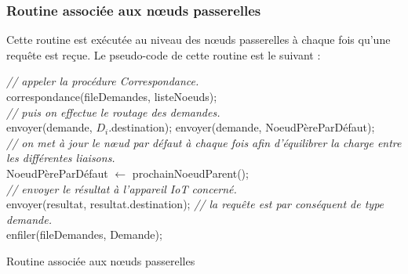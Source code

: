\subsubsection{Routine associée aux nœuds passerelles}
Cette routine est exécutée au niveau des nœuds passerelles à chaque fois qu'une requête est reçue.
Le pseudo-code de cette routine est le suivant :\\
\begin{algorithm}[H]
  {  
    \emph{// appeler la  procédure Correspondance.}\\
    correspondance(fileDemandes, listeNoeuds);\\
    \emph{// puis on effectue le routage des demandes.}\\
    {
      {
        envoyer(demande, $D_i$.destination);
      }
      {
        envoyer(demande, NoeudPèreParDéfaut);\\
        \emph{// on met à jour le nœud par défaut à chaque fois afin d'équilibrer la charge entre les différentes liaisons.}\\
        NoeudPèreParDéfaut $\gets$ prochainNoeudParent();\\
      }
    }
  }
  {
    {
      \emph{// envoyer le résultat à l'appareil IoT concerné.}\\
      envoyer(resultat, resultat.destination);
    }
    {
      \emph{// la requête est par conséquent de type demande.}\\
      enfiler(fileDemandes, Demande);
    }
  }
  \caption{Routine associée aux nœuds passerelles}
\end{algorithm}
\\
